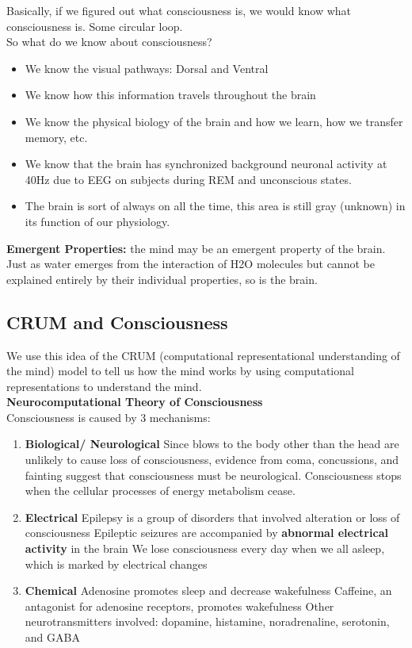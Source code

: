 \documentclass{article}
\begin{document}
Basically, if we figured out what consciousness is, we would know what consciousness is. Some circular loop. \\

So what do we know about consciousness? \\ 
\begin{itemize}
    \item We know the visual pathways: Dorsal and Ventral
    \item We know how this information travels throughout the brain
    \item We know the physical biology of the brain and how we learn, how we transfer memory, etc. 
    \item We know that the brain has synchronized background neuronal activity at 40Hz due to EEG on subjects during REM and unconscious states. 
    \item The brain is sort of always on all the time, this area is still gray (unknown) in its function of our physiology. 
\end{itemize}

\noindent \textbf{Emergent Properties:} the mind may be an emergent property of the brain. \\

Just as water emerges from the interaction of H2O molecules but cannot be explained entirely by their individual properties, so is the brain. \\

\subsection{CRUM and Consciousness}
We use this idea of the CRUM (computational representational understanding of the mind) model to tell us how the mind works by using computational representations to understand the mind. \\ 

\noindent \textbf{Neurocomputational Theory of Consciousness} \\
Consciousness is caused by 3 mechanisms: 
\begin{enumerate}
    \item \textbf{Biological/ Neurological}
        \subitem Since blows to the body other than the head are unlikely to cause loss of consciousness, evidence from coma, concussions, and fainting suggest that consciousness must be neurological. \subitem Consciousness stops when the cellular processes of energy metabolism cease. 
    \item \textbf{Electrical}
        \subitem Epilepsy is a group of disorders that involved alteration or loss of consciousness
        \subitem Epileptic seizures are accompanied by \textbf{abnormal electrical activity} in the brain
        \subitem We lose consciousness every day when we all asleep, which is marked by electrical changes
    \item \textbf{Chemical}
        \subitem Adenosine promotes sleep and decrease wakefulness
        \subitem Caffeine, an antagonist for adenosine receptors, promotes wakefulness
        \subitem Other neurotransmitters involved: dopamine, histamine, noradrenaline, serotonin, and GABA
\end{enumerate}
\end{document}
